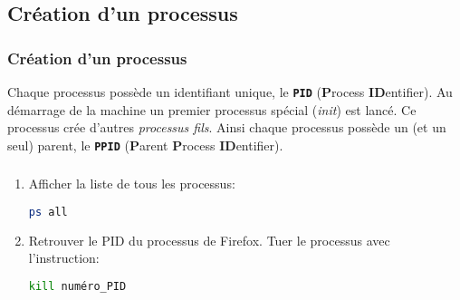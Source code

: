 \documentclass[svgnames,11pt]{beamer}
\begin{document}
\subsection{Création d'un processus}
\begin{frame}
    \frametitle{Création d'un processus}

    \begin{aretenir}[]
        Chaque processus possède un identifiant unique, le \textbf{\texttt{PID}} (\textbf{P}rocess \textbf{ID}entifier). Au démarrage de la machine un premier processus spécial  (\emph{init}) est lancé. Ce processus crée d'autres \emph{processus fils}. Ainsi chaque processus possède un (et un seul) parent, le \textbf{\texttt{PPID}} (\textbf{P}arent \textbf{P}rocess \textbf{ID}entifier).
    \end{aretenir}

\end{frame}
\begin{frame}[fragile]
    \frametitle{}

    \begin{activite}
    \begin{enumerate}
        \item Afficher la liste de tous les processus:
        \begin{center}
        \begin{lstlisting}[language=Bash , basicstyle=\ttfamily\small, xleftmargin=2em, xrightmargin=2em]
ps all
\end{lstlisting}
        \end{center}
        \item Retrouver le  PID du processus de Firefox. Tuer le processus avec l'instruction:
        \begin{center}
            \begin{lstlisting}[language=Bash , basicstyle=\ttfamily\small, xleftmargin=2em, xrightmargin=2em]
kill numéro_PID
\end{lstlisting}
            \end{center}
    \end{enumerate}
    \end{activite}
\end{frame}
\end{document}
